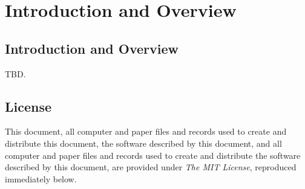 \chapter{Introduction and Overview}

\label{ciov0}

\section{Introduction and Overview}
\label{ciov2:siov0}

TBD.

\section{License}
\label{ciov2:slic0}

This document, all computer and paper files and records used to create and
distribute this document, the software described by this document, and all computer
and paper files and records used to create and distribute the software described by
this document, are provided under \emph{The MIT License},
reproduced immediately below.\\

